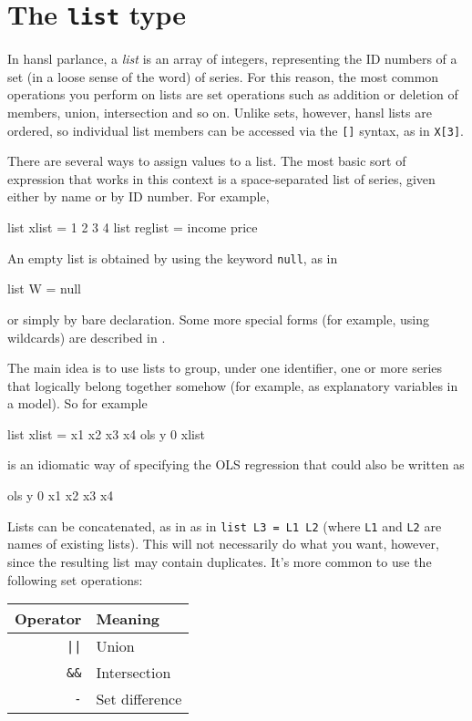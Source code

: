 \section{The \texttt{list} type}
\label{sec:lists}
 
In hansl parlance, a \textit{list} is an array of integers,
representing the ID numbers of a set (in a loose sense of the word) of
series.  For this reason, the most common operations you perform on
lists are set operations such as addition or deletion of members,
union, intersection and so on. Unlike sets, however, hansl lists are
ordered, so individual list members can be accessed via the
\texttt{[]} syntax, as in \texttt{X[3]}.

There are several ways to assign values to a list.  The most basic
sort of expression that works in this context is a space-separated
list of series, given either by name or by ID number.  For example,
\begin{code}
list xlist = 1 2 3 4
list reglist = income price 
\end{code}
An empty list is obtained by using the keyword \texttt{null}, as in
\begin{code}
list W = null  
\end{code}
or simply by bare declaration. Some more special forms (for example,
using wildcards) are described in \GUG.

The main idea is to use lists to group, under one identifier, one or
more series that logically belong together somehow (for example, as
explanatory variables in a model). So for example
\begin{code}
list xlist = x1 x2 x3 x4
ols y 0 xlist
\end{code}
is an idiomatic way of specifying the OLS regression that could also
be written as
\begin{code}
ols y 0 x1 x2 x3 x4
\end{code}

Lists can be concatenated, as in as in \texttt{list L3 = L1 L2} (where
\texttt{L1} and \texttt{L2} are names of existing lists). This will
not necessarily do what you want, however, since the resulting list
may contain duplicates. It's more common to use the following set
operations:

\begin{center}
  \begin{tabular}{rl}
    \textbf{Operator} & \textbf{Meaning} \\
    \hline
    \verb,||, & Union \\
    \verb|&&| & Intersection \\
    \verb|-|  & Set difference \\
    \hline
  \end{tabular}
\end{center}

